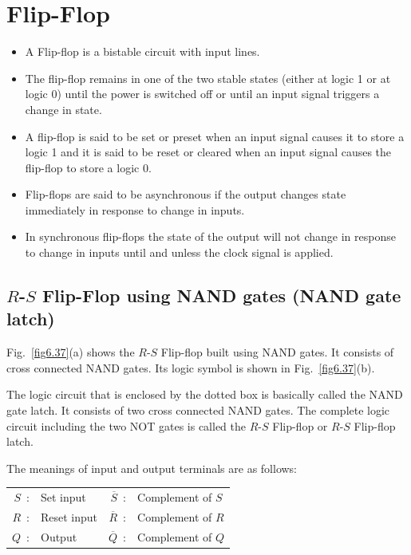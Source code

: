 \section{Flip-Flop}\label{sec6.36}

\begin{itemize}
\item A Flip-flop is a bistable circuit with input lines.

\item The flip-flop remains in one of the two stable states (either at logic 1 or at logic 0) until the power is switched off or until an input signal triggers a change in state.

\item A flip-flop is said to be set or preset when an input signal causes it to store a logic 1 and it is said to be reset or cleared when an input signal causes the flip-flop to store a logic 0.

\item Flip-flops are said to be asynchronous if the output changes state immediately in response to change in inputs.

\item In synchronous flip-flops the state of the output will not change in response to change in inputs until and unless the clock signal is applied.
\end{itemize}


\subsection[$R$-$S$ Flip-Flop using NAND gates (NAND gate latch)]{\boldmath$R$-$S$ Flip-Flop using NAND gates (NAND gate latch)}

Fig.~\ref{fig6.37}(a) shows the $R$-$S$ Flip-flop built using NAND gates. It consists of cross connected NAND gates. Its logic symbol is shown in Fig.~\ref{fig6.37}(b).

The logic circuit that is enclosed by the dotted box is basically called the NAND gate latch. It consists of two cross connected NAND gates. The complete logic circuit including the two NOT gates is called the $R$-$S$ Flip-flop or $R$-$S$ Flip-flop latch.

The meanings of input and output terminals are as follows:
\begin{center}
\begin{tabular}{r@{\;\,}l@{\qquad\qquad}r@{\;\,}l}
$S$~: & Set input & $\overline{S}$~: & Complement of $S$\\[4pt]
$R$~: & Reset input & $\overline{R}$~: & Complement of $R$\\[4pt]
$Q$~: & Output & $\overline{Q}$~: & Complement of $Q$
\end{tabular}
\end{center}

